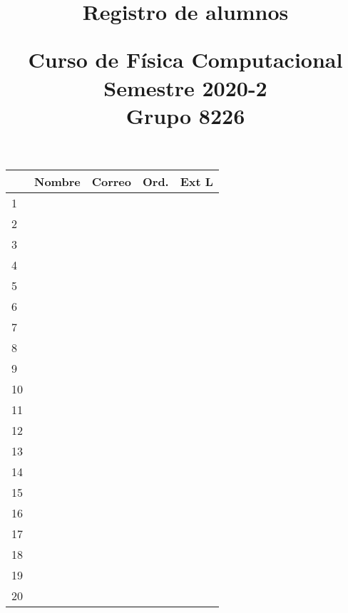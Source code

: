 \documentclass[11pt]{article}
\title{Registro de alumnos \\ \begin{large}Curso de Física Computacional \\ Semestre 2020-2   \\ Grupo 8226 \end{large}}
\date{ }
\begin{document}
\maketitle
\fontsize{12}{12}\selectfont
\begin{tabular}{| l | >{\centering\arraybackslash}m{7cm}| >{\centering\arraybackslash}m{5cm} | c | c |}
\hline
 & Nombre & Correo & Ord. & Ext L \\
\hline 1 & & & & \\
\hline 2 & & & &  \\
\hline 3 & & & &  \\
\hline 4 & & & &  \\
\hline 5 & & & &  \\
\hline 6 & & & &  \\
\hline 7 & & & &  \\
\hline 8 & & & &  \\
\hline 9 & & & &  \\
\hline 10 & & & &  \\
\hline 11 & & & &  \\
\hline 12 & & & &  \\
\hline 13 & & & &  \\
\hline 14 & & & &  \\
\hline 15 & & & &  \\
\hline 16 & & & &  \\
\hline 17 & & & &  \\
\hline 18 & & & &  \\
\hline 19 & & & &  \\
\hline 20 & & & &  \\
\hline
\end{tabular}
\end{document}
